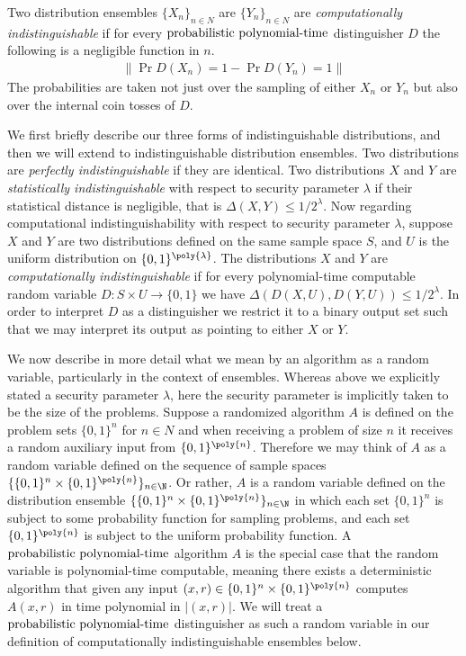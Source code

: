 \begin{definition}
    Two distribution ensembles $\{X_n\}_{n\in N}$ are $\{Y_n\}_{n\in N}$ are \emph{computationally indistinguishable} if for every $\text{probabilistic polynomial-time}$ distinguisher $D$ the following is a negligible function in $n$.
    \begin{align}
        \| \Pr{D(X_n)=1} - \Pr{D(Y_n)=1} \|
    \end{align}
    The probabilities are taken not just over the sampling of either $X_n$ or $Y_n$ but also over the internal coin tosses of $D$.
\end{definition}

We first briefly describe our three forms of indistinguishable distributions, and then we will extend to indistinguishable distribution ensembles.
Two distributions are \emph{perfectly indistinguishable} if they are identical.
Two distributions $X$ and $Y$ are \emph{statistically indistinguishable} with respect to security parameter $\lambda$ if their statistical distance is negligible, that is $\Delta(X,Y)\leq 1/2^\lambda$.
Now regarding computational indistinguishability with respect to security parameter $\lambda$, suppose $X$ and $Y$ are two distributions defined on the same sample space $S$, and $U$ is the uniform distribution on $\{0,1\}^{\poly{\lambda}}$.
The distributions $X$ and $Y$ are \emph{computationally indistinguishable} if for every polynomial-time computable random variable $D\colon S\times U\to\{0,1\}$ we have $\Delta(D(X,U),D(Y,U))\leq 1/2^\lambda$.
In order to interpret $D$ as a distinguisher we restrict it to a binary output set such that we may interpret its output as pointing to either $X$ or $Y$.

We now describe in more detail what we mean by an algorithm as a random variable, particularly in the context of ensembles.
Whereas above we explicitly stated a security parameter $\lambda$, here the security parameter is implicitly taken to be the size of the problems.
Suppose a randomized algorithm $A$ is defined on the problem sets $\{0,1\}^n$ for $n\in N$ and when receiving a problem of size $n$ it receives a random auxiliary input from $\{0,1\}^{\poly{n}}$.
Therefore we may think of $A$ as a random variable defined on the sequence of sample spaces $\{ \{0,1\}^n\times\{0,1\}^{\poly{n}} \}_{n\in\N}$.
Or rather, $A$ is a random variable defined on the distribution ensemble $\{ \{0,1\}^n\times\{0,1\}^{\poly{n}} \}_{n\in\N}$ in which each set $\{0,1\}^n$ is subject to some probability function for sampling problems, and each set $\{0,1\}^{\poly{n}}$ is subject to the uniform probability function.
A $\text{probabilistic polynomial-time}$ algorithm $A$ is the special case that the random variable is polynomial-time computable, meaning there exists a deterministic algorithm that given any input $(x,r)\in\{0,1\}^n\times\{0,1\}^{\poly{n}}$ computes $A(x,r)$ in time polynomial in $|(x,r)|$.
We will treat a $\text{probabilistic polynomial-time}$ distinguisher as such a random variable in our definition of computationally indistinguishable ensembles below.

